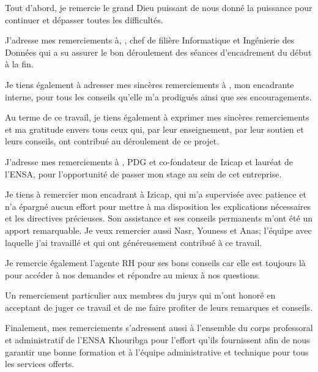 \remerciements

Tout d’abord, je remercie le grand Dieu puissant de nous donné la puissance pour continuer et dépasser toutes les difficultés.

\medskip

J’adresse mes remerciements à, \textbf{}, chef de filière Informatique et Ingénierie des Données qui a su assurer le bon déroulement des séances d’encadrement du début à la fin.

\medskip

Je tiens également à adresser mes sincères remerciements à \textbf{}, mon encadrante interne, pour tous les conseils qu’elle m’a prodigués ainsi que ses encouragements.

\medskip

Au terme de ce travail, je tiens également à exprimer mes sincères remerciements et ma gratitude envers tous ceux qui, par leur enseignement, par leur soutien et leurs conseils, ont contribué au déroulement de ce projet.

\medskip

J’adresse mes remerciements à \textbf{}, PDG et co-fondateur de Izicap et lauréat de l’ENSA, pour l’opportunité de passer mon stage au sein de cet entreprise.

\medskip

Je tiens à remercier mon encadrant à Izicap, \textbf{} qui m’a supervisée avec patience et n’a épargné aucun effort pour mettre à ma disposition les explications nécessaires et les directives précieuses. Son assistance et ses conseils permanents m’ont été un apport remarquable. Je veux remercier aussi Nasr, Youness et Anas; l’équipe avec laquelle j’ai travaillé et qui ont généreusement contribué à ce travail.

\medskip

Je remercie également l'agente RH \textbf{} pour ses bons conseils car elle est toujours là pour accéder à nos demandes et répondre au mieux à nos questions.

\medskip

Un remerciement particulier aux membres du jurys qui m’ont honoré en acceptant de juger ce travail et de me faire profiter de leurs remarques et conseils.

\medskip

Finalement, mes remerciements s’adressent aussi à l’ensemble du corps professoral et administratif de l’ENSA Khouribga pour l’effort qu’ils fournissent afin de nous garantir une bonne formation et à l’équipe administrative et technique pour tous les services offerts.